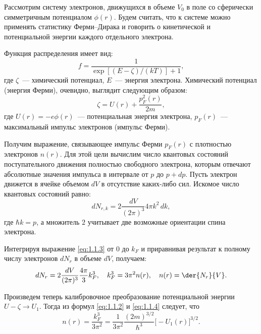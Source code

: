   Рассмотрим систему электронов, движущихся в объеме \( V_0 \) в поле со
  сферически симметричным потенциалом \( \phi(r) \). Будем считать, что к
  системе можно применять статистику Ферми--Дирака и говорить о кинетической и
  потенциальной энергии каждого отдельного электрона.
  
  Функция распределения имеет вид:
  \begin{equation}
    f = \frac{1}{\exp[(E - \zeta) / (kT)] + 1},
    \label{eq:1.1.1}
  \end{equation}
  где \( \zeta \)~--- химический потенциал, \( E \)~--- энергия электрона.
  Химический потенциал (энергия Ферми), очевидно, выглядит следующим образом:
  \begin{equation}
    \zeta = U(r) + \frac{p_F^2(r)}{2m},
    \label{eq:1.1.2}
  \end{equation}
  где \( U(r) = -e\phi(r) \)~--- потенциальная энергия электрона,
  \( p_F(r) \)~--- максимальный импульс электронов (импульс Ферми).
  
  Получим выражение, связывающее импульс Ферми \( p_F(r) \) с плотностью
  электронов \( n(r) \). Для этой цели вычислим число квантовых состояний
  поступательного движения полностью свободного электрона, которым отвечают
  абсолютные значения импульса в интервале от \( p \) до \( p + dp \). Пусть
  электрон движется в ячейке объемом \( dV \) в отсутствие каких-либо сил.
  Искомое число квантовых состояний равно:
  \begin{equation}
    dN_{r, k} = 2\frac{dV}{(2\pi)^3} 4\pi k^2\,dk,
    \label{eq:1.1.3}
  \end{equation}
  где \( \hbar k = p \), а множитель \( 2 \) учитывает две возможные ориентации
  спина электрона.
  
  Интегрируя выражение \eqref{eq:1.1.3} от \( 0 \) до \( k_F \) и приравнивая
  результат к полному числу электронов \( dN_r \) в объеме \( dV \), получаем:
  \begin{equation}
    dN_r = 2\frac{dV}{(2\pi)^3} \frac{4\pi}{3}k_F^3, \quad k_F^3 = 3\pi^2 n(r),
      \quad n(r) = \der{N_r}{V}.
    \label{eq:1.1.4}
  \end{equation}
  
  Произведем теперь калибровочное преобразование потенциальной энергии
  \( U - \zeta \to U_1 \). Тогда из формул \eqref{eq:1.1.2} и \eqref{eq:1.1.4}
  следует, что
  \begin{equation}
    n(r) = \frac{k_F^3}{3\pi^2} = \frac{1}{3\pi^2} \frac{(2m)^{3 / 2}}{\hbar^3}
      \bigl[-U_1(r)\big]^{3 / 2}.
    \label{eq:1.1.5}
  \end{equation}
  
